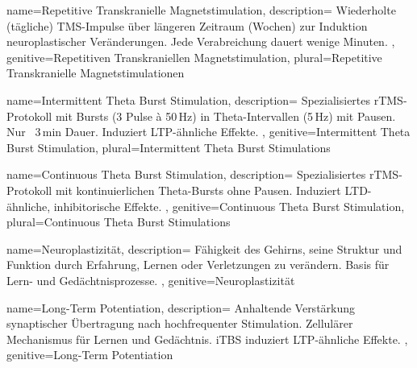
{
	name=Repetitive Transkranielle Magnetstimulation,
	description={
			Wiederholte (tägliche) \gls{TMS}-Impulse über längeren Zeitraum (Wochen) zur Induktion neuroplastischer Veränderungen. Jede Verabreichung dauert wenige Minuten.
		},
	genitive=Repetitiven Transkraniellen Magnetstimulation,
	plural=Repetitive Transkranielle Magnetstimulationen
}


{
	name=Intermittent Theta Burst Stimulation,
	description={
			Spezialisiertes \gls{rTMS}-Protokoll mit Bursts (3 Pulse à 50\,Hz) in Theta-Intervallen (5\,Hz) mit Pausen. Nur ~3\,min Dauer. Induziert \gls{LTP}-ähnliche Effekte. \cite{huang_theta_2005, hoy_enhancement_2016}
		},
	genitive=Intermittent Theta Burst Stimulation,
	plural=Intermittent Theta Burst Stimulations
}


{
	name=Continuous Theta Burst Stimulation,
	description={
			Spezialisiertes \gls{rTMS}-Protokoll mit kontinuierlichen Theta-Bursts ohne Pausen. Induziert \gls{LTD}-ähnliche, inhibitorische Effekte. \cite{huang_theta_2005}
		},
	genitive=Continuous Theta Burst Stimulation,
	plural=Continuous Theta Burst Stimulations
}



{
	name=Neuroplastizität,
	description={
			Fähigkeit des Gehirns, seine Struktur und Funktion durch Erfahrung, Lernen oder Verletzungen zu verändern. Basis für Lern- und Gedächtnisprozesse.
		},
	genitive=Neuroplastizität
}

{
	name=Long-Term Potentiation,
	description={
			Anhaltende Verstärkung synaptischer Übertragung nach hochfrequenter Stimulation. Zellulärer Mechanismus für Lernen und Gedächtnis. \gls{iTBS} induziert LTP-ähnliche Effekte. \cite{esser_level_2006, cavaleiro_memory_2020}
		},
	genitive=Long-Term Potentiation
}

